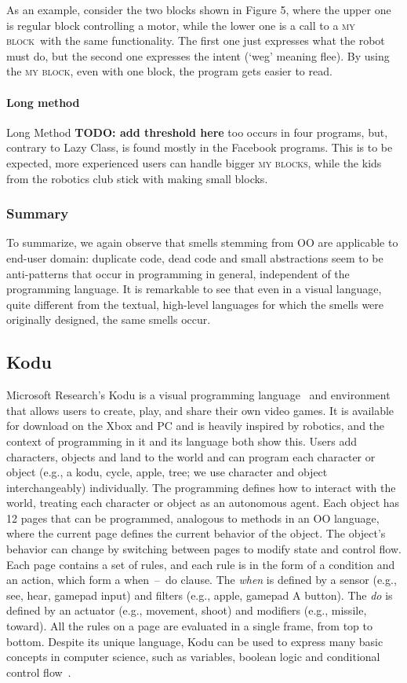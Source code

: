 \documentclass{sig-alternate}
\newcommand{\todo}[1]{\textbf{TODO: #1}}
\newcommand{\mbs}{\textsc{my blocks}}
\newcommand{\mb}{\textsc{my block}}
\begin{document}
As an example, consider the two blocks shown in Figure 5, where the upper one is regular block controlling a motor, while the lower one is a call to a \mb~with the same functionality. The first one just expresses what the robot must do, but the second one expresses the intent (`weg' meaning flee). By using the \mb, even with one block, the program gets easier to read.

\paragraph{Long method}
Long Method \todo{add threshold here} too occurs in four programs, but, contrary to Lazy Class, is found mostly in the Facebook programs. This is to be expected, more experienced users can handle bigger \mbs, while the kids from the robotics club stick with making small blocks.

\subsubsection{Summary}
To summarize, we again observe that smells stemming from OO are applicable to end-user domain: duplicate code, dead code and small abstractions seem to be anti-patterns that occur in programming in general, independent of the programming language. It is remarkable to see that even in a visual language, quite different from the textual, high-level languages for which the smells were originally designed, the same smells occur.


\subsection{Kodu}
Microsoft Research's Kodu is a visual programming language~\cite{kodugrammar} and environment that allows users to create, play, and share their own video games. 
It is available for download on the Xbox and PC and is heavily inspired by robotics, and the context of programming in it and its language both show this. 
Users add characters, objects and land to the world and can program each character or object (e.g., a kodu, cycle, apple, tree; we use character and object interchangeably) individually. The programming defines how to interact with the world, treating each character or object as an autonomous agent. Each object has 12 pages that can be programmed, analogous to methods in an OO language, where the current page defines the current behavior of the object. 
The object's behavior can change by switching between pages to modify state and control flow. 
Each page contains a set of rules, and each rule is in the form of a condition and an action, which form a when~--~do clause. The \emph{when} is defined by a sensor (e.g., see, hear, gamepad input) and filters (e.g., apple, gamepad A button). The \emph{do} is defined by an actuator (e.g., movement, shoot) and modifiers (e.g., missile, toward). All the rules on a page are evaluated in a single frame, from top to bottom. 
Despite its unique language, Kodu  can be used to express many basic concepts in computer science, such as variables, boolean logic and conditional control flow~\cite{Stolee:2011:ECS:1953163.1953197}. 
\end{document}
